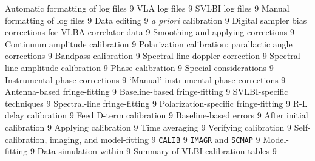  {Automatic formatting of log files}        {9}
 {VLA log files}                            {9}
 {SVLBI log files}                          {9}
 {Manual formatting of log files}           {9}
 {Data editing}                                {9}
 {{\it a priori\/} calibration}                {9}
 {Digital sampler bias corrections for VLBA
                       correlator data}                       {9}
 {Smoothing and applying corrections}       {9}
 {Continuum amplitude calibration}          {9}
 {Polarization calibration: parallactic
                       angle corrections}                     {9}
 {Bandpass calibration}                        {9}
 {Spectral-line doppler correction}            {9}
 {Spectral-line amplitude calibration}         {9}
 {Phase calibration}                           {9}
 {Special considerations}                   {9}
 {Instrumental phase corrections}           {9}
 {`Manual' instrumental phase corrections} {9}
 {Antenna-based fringe-fitting}             {9}
 {Baseline-based fringe-fitting}            {9}
 {SVLBI-specific techniques}                {9}
 {Spectral-line fringe-fitting}             {9}
 {Polarization-specific fringe-fitting}     {9}
 {R-L delay calibration}                 {9}
 {Feed D-term calibration}               {9}
 {Baseline-based errors}                       {9}
   {After initial calibration}                   {9}
 {Applying calibration}                        {9}
 {Time averaging}                              {9}
 {Verifying calibration}                       {9}
   {Self-calibration, imaging, and model-fitting} {9}
 {{\tt CALIB}}                                 {9}
 {{\tt IMAGR} and {\tt SCMAP}}                 {9}
 {Model-fitting}                               {9}
   {Data simulation within \AIPS}                {9}
   {Summary of VLBI calibration tables}          {9}

